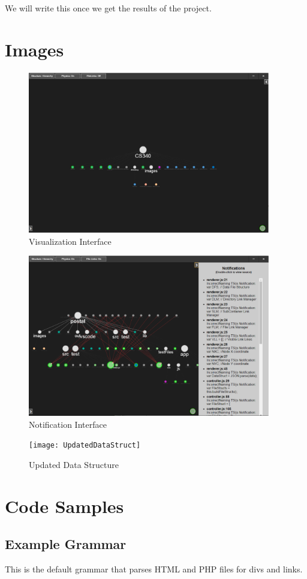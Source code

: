 \documentclass[letterpaper,10pt,titlepage,draftclsnofoot,onecolumn,onesided] {IEEEtran}
\begin{document}
	We will write this once we get the results of the project.	


\pagebreak	
\section{Images}
	\begin{figure}
		\includegraphics[width=400px]{PostalUI}
		\caption{Visualization Interface}  
	\end{figure}
	
	\begin{figure}
		\includegraphics[width=400px]{PostalNotification}
		\caption{Notification Interface}  
	\end{figure}
	
	\begin{figure}
		\texttt{[image: UpdatedDataStruct]}
		\caption{Updated Data Structure}
	\end{figure}

\pagebreak
\section{Code Samples}
	\subsection{Example Grammar}
	This is the default grammar that parses HTML and PHP files for divs and links.
	
\end{document}
